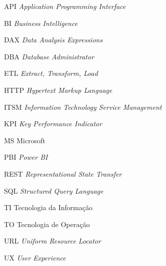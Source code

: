 \begin{siglas}
\item[] 
  \item[API] \textit{Application Programming Interface}
  \item[BI] \textit{Business Intelligence}
  \item[DAX] \textit{Data Analysis Expressions}
  \item[DBA] \textit{Database Administrator}
  \item[ETL] \textit{Extract, Transform, Load}
  \item[HTTP] \textit{Hypertext Markup Language}
  \item[ITSM] \textit{Information Technology Service Management}
  \item[KPI] \textit{Key Performance Indicator}
  \item[MS] Microsoft
  \item[PBI] \textit{Power BI}
  \item[REST] \textit{Representational State Transfer}
  \item[SQL] \textit{Structured Query Language}
  \item[TI] Tecnologia da Informação
  \item[TO] Tecnologia de Operação
  \item[URL] \textit{Uniform Resource Locator}
  \item[UX] \textit{User Experience}
\end{siglas}
